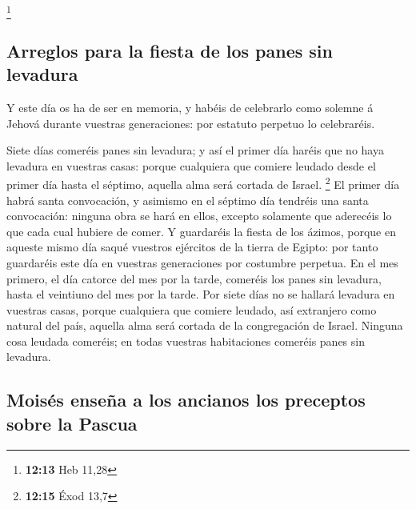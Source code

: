 \footnote{\textbf{12:13} Heb 11,28}

\hypertarget{arreglos-para-la-fiesta-de-los-panes-sin-levadura}{%
\subsection{Arreglos para la fiesta de los panes sin
levadura}\label{arreglos-para-la-fiesta-de-los-panes-sin-levadura}}

 Y este día os ha de ser en memoria, y habéis de celebrarlo
como solemne á Jehová durante vuestras generaciones: por estatuto
perpetuo lo celebraréis.

 Siete días comeréis panes sin levadura; y así el primer
día haréis que no haya levadura en vuestras casas: porque cualquiera que
comiere leudado desde el primer día hasta el séptimo, aquella alma será
cortada de Israel. \footnote{\textbf{12:15} Éxod 13,7}  El
primer día habrá santa convocación, y asimismo en el séptimo día
tendréis una santa convocación: ninguna obra se hará en ellos, excepto
solamente que aderecéis lo que cada cual hubiere de comer. 
Y guardaréis la fiesta de los ázimos, porque en aqueste mismo día saqué
vuestros ejércitos de la tierra de Egipto: por tanto guardaréis este día
en vuestras generaciones por costumbre perpetua.  En el mes
primero, el día catorce del mes por la tarde, comeréis los panes sin
levadura, hasta el veintiuno del mes por la tarde.  Por
siete días no se hallará levadura en vuestras casas, porque cualquiera
que comiere leudado, así extranjero como natural del país, aquella alma
será cortada de la congregación de Israel.  Ninguna cosa
leudada comeréis; en todas vuestras habitaciones comeréis panes sin
levadura.

\hypertarget{moisuxe9s-enseuxf1a-a-los-ancianos-los-preceptos-sobre-la-pascua}{%
\subsection{Moisés enseña a los ancianos los preceptos sobre la
Pascua}\label{moisuxe9s-enseuxf1a-a-los-ancianos-los-preceptos-sobre-la-pascua}}

